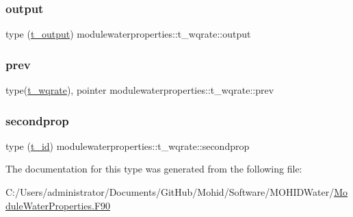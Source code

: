 \subsubsection{\texorpdfstring{output}{output}}
{\footnotesize\ttfamily type (\mbox{\hyperlink{structmodulewaterproperties_1_1t__output}{t\+\_\+output}}) modulewaterproperties\+::t\+\_\+wqrate\+::output\hspace{0.3cm}{\ttfamily [private]}}

\mbox{\label{structmodulewaterproperties_1_1t__wqrate_a198afac66ca3e27e29bc88dcd2869e8d}} 
\subsubsection{\texorpdfstring{prev}{prev}}
{\footnotesize\ttfamily type(\mbox{\hyperlink{structmodulewaterproperties_1_1t__wqrate}{t\+\_\+wqrate}}), pointer modulewaterproperties\+::t\+\_\+wqrate\+::prev\hspace{0.3cm}{\ttfamily [private]}}

\mbox{\label{structmodulewaterproperties_1_1t__wqrate_a1f91a8e1dc25d4ceb08324faa3edf474}} 
\subsubsection{\texorpdfstring{secondprop}{secondprop}}
{\footnotesize\ttfamily type (\mbox{\hyperlink{structmodulewaterproperties_1_1t__id}{t\+\_\+id}}) modulewaterproperties\+::t\+\_\+wqrate\+::secondprop\hspace{0.3cm}{\ttfamily [private]}}



The documentation for this type was generated from the following file\+:\begin{DoxyCompactItemize}
\item 
C\+:/\+Users/administrator/\+Documents/\+Git\+Hub/\+Mohid/\+Software/\+M\+O\+H\+I\+D\+Water/\mbox{\hyperlink{_module_water_properties_8_f90}{Module\+Water\+Properties.\+F90}}\end{DoxyCompactItemize}
